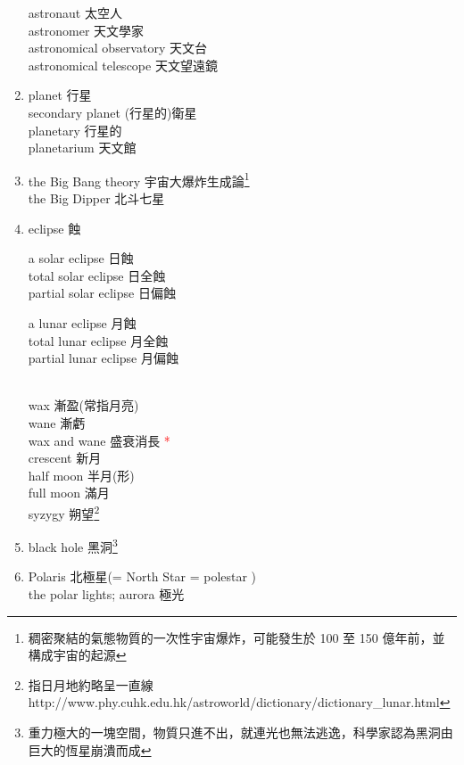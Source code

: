 \documentclass[twoside,b5paper]{book}
\begin{document}
\begin{enumerate}
      astronaut  太空人\\
      astronomer  天文學家\\
      astronomical observatory  天文台\\
      astronomical telescope 天文望遠鏡
    \item
      planet 行星\\
      secondary planet (行星的)衛星\\
      planetary  行星的\\
      planetarium  天文館
    \item
      the Big Bang theory 宇宙大爆炸生成論\footnote{稠密聚結的氣態物質的一次性宇宙爆炸，可能發生於 100 至 150 億年前，並構成宇宙的起源}\\
      the Big Dipper 北斗七星
    \item
      eclipse  蝕\\
      \parbox[]{140pt}{a solar eclipse 日蝕\\total solar eclipse 日全蝕\\partial solar eclipse 日偏蝕}
      \parbox[]{140pt}{a lunar eclipse 月蝕\\total lunar eclipse 月全蝕\\partial lunar eclipse 月偏蝕}\\
      wax 漸盈(常指月亮)\\
      wane 漸虧\\
      wax and wane 盛衰消長 \textcolor{red}{*}\\
      crescent  新月\\
      half moon 半月(形)\\
      full moon 滿月\\
      syzygy  朔望\footnote{指日月地約略呈一直線 http://www.phy.cuhk.edu.hk/astroworld/dictionary/dictionary\_{}lunar.html}
    \item
      black hole 黑洞\footnote{重力極大的一塊空間，物質只進不出，就連光也無法逃逸，科學家認為黑洞由巨大的恆星崩潰而成}
    \item
      Polaris  北極星(= North Star = polestar )\\
      the polar lights; aurora  極光\\

\end{enumerate}
\end{document}
